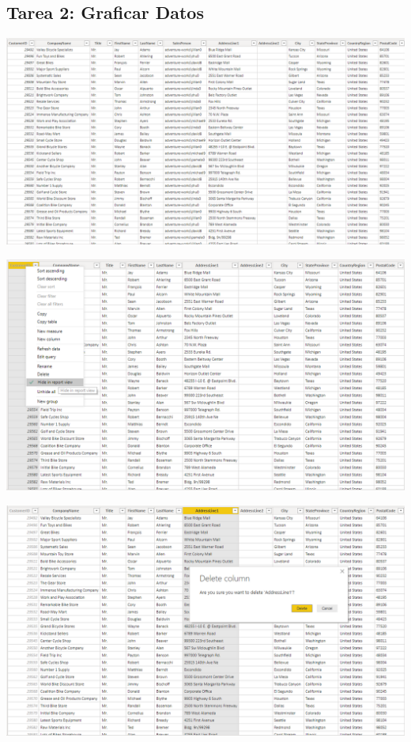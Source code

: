 \documentclass[12pt,letterpaper]{article}
\begin{document}
\subsection{Tarea 2: Graficar Datos}
\begin{center}
\includegraphics[width=15cm]{images/11}\newline
\end{center}
\begin{center}
\includegraphics[width=15cm]{images/22}\newline
\end{center}
\begin{center}
\includegraphics[width=15cm]{images/33}\newline
\end{center}
\end{document}
